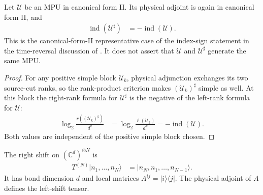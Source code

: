 \begin{lemma}
    \label{thm:mpu_cfii_index_physical_adjoint}
    \leanok
    Let $\mathcal U$ be an MPU in canonical form II. Its physical adjoint is
    again in canonical form II, and
    \begin{align}
        \operatorname{ind}(\mathcal U^\sharp)
         & =-\operatorname{ind}(\mathcal U).
    \end{align}
    This is the canonical-form-II representative case of the index-sign
    statement in the time-reversal discussion of
    \cite{Cirac2017MPU}. It does not assert that $\mathcal U$ and
    $\mathcal U^\sharp$ generate the same MPU.
\end{lemma}

\begin{proof}\leanok
    For any positive simple block $\mathcal U_k$, physical adjunction
    exchanges its two source-cut ranks, so the rank-product criterion makes
    $(\mathcal U_k)^\sharp$ simple as well. At this block the right-rank
    formula for $\mathcal U^\sharp$ is the negative of the left-rank formula
    for $\mathcal U$:
    \begin{align}
        \log_2\frac{r((\mathcal U_k)^\sharp)}{d^k}
         & =\log_2\frac{\ell(\mathcal U_k)}{d^k}
        =-\operatorname{ind}(\mathcal U).
    \end{align}
    Both values are independent of the positive simple block chosen.
\end{proof}

\begin{definition}
    \label{def:mpu_shift_tensors}
    \leanok
    The right shift on $(\mathbb C^d)^{\otimes N}$ is
    \begin{align}
        T^{(N)}\lvert n_1,\ldots,n_N\rangle
         & =\lvert n_N,n_1,\ldots,n_{N-1}\rangle.
    \end{align}
    It has bond dimension $d$ and local matrices
    $A^{ij}=\lvert i\rangle\langle j\rvert$.
    The physical adjoint of $A$ defines the left-shift tensor.
\end{definition}

